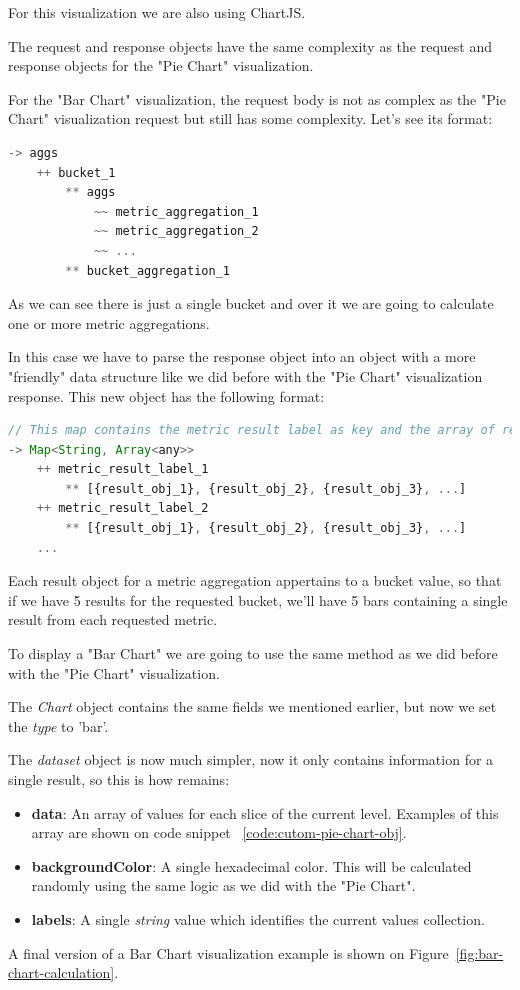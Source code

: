 \documentclass[a4paper, 12pt, english]{book}
\begin{document}
For this visualization we are also using ChartJS.

The request and response objects have the same complexity as the request and response objects for the "Pie Chart" visualization.

For the "Bar Chart" visualization, the request body is not as complex as the "Pie Chart" visualization request but still has some complexity. Let's see its format:
\begin{lstlisting}[language=javascript, caption=Bar Chart request body format, label=code:bar-chart-request]
-> aggs
    ++ bucket_1
        ** aggs
            ~~ metric_aggregation_1
            ~~ metric_aggregation_2
            ~~ ...
        ** bucket_aggregation_1
\end{lstlisting}

As we can see there is just a single bucket and over it we are going to calculate one or more metric aggregations.

In this case we have to parse the response object into an object with a more "friendly" data structure like we did before with the "Pie Chart" visualization response. This new object has the following format:
\begin{lstlisting}[language=javascript, caption=Custom results object, label=code:cutom-pie-chart-obj]
// This map contains the metric result label as key and the array of results as value.
-> Map<String, Array<any>>
    ++ metric_result_label_1
        ** [{result_obj_1}, {result_obj_2}, {result_obj_3}, ...]
    ++ metric_result_label_2
        ** [{result_obj_1}, {result_obj_2}, {result_obj_3}, ...]
    ...
\end{lstlisting}

Each result object for a metric aggregation appertains to a bucket value, so that if we have 5 results for the requested bucket, we'll have 5 bars containing a single result from each requested metric.

To display a "Bar Chart" we are going to use the same method as we did before with the "Pie Chart" visualization.

The \textit{Chart} object contains the same fields we mentioned earlier, but now we set the \textit{type} to 'bar'.

The \textit{dataset} object is now much simpler, now it only contains information for a single result, so this is how remains:
\begin{itemize}
    \item \textbf{data}: An array of values for each slice of the current level. Examples of this array are shown on code snippet ~\ref{code:cutom-pie-chart-obj}.
    \item \textbf{backgroundColor}: A single hexadecimal color. This will be calculated randomly using the same logic as we did with the "Pie Chart".
    \item \textbf{labels}: A single \textit{string} value which identifies the current values collection.
\end{itemize}
A final version of a Bar Chart visualization example is shown on Figure~\ref{fig:bar-chart-calculation}.
\end{document}
